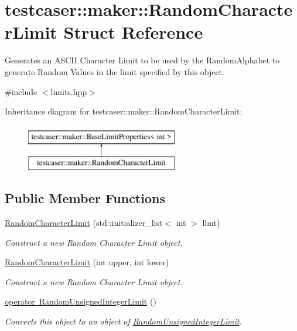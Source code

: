 \hypertarget{structtestcaser_1_1maker_1_1RandomCharacterLimit}{}\section{testcaser\+:\+:maker\+:\+:Random\+Character\+Limit Struct Reference}
\label{structtestcaser_1_1maker_1_1RandomCharacterLimit}


Generates an A\+S\+C\+II Character Limit to be used by the Random\+Alphabet to generate Random Values in the limit specified by this object.  




{\ttfamily \#include $<$limits.\+hpp$>$}

Inheritance diagram for testcaser\+:\+:maker\+:\+:Random\+Character\+Limit\+:\begin{figure}[H]
\begin{center}
\leavevmode
\includegraphics[height=2.000000cm]{structtestcaser_1_1maker_1_1RandomCharacterLimit}
\end{center}
\end{figure}
\subsection*{Public Member Functions}
\begin{DoxyCompactItemize}
\item 
\mbox{\hyperlink{structtestcaser_1_1maker_1_1RandomCharacterLimit_a2ebd894bf7f536219bf7a917ed036c55}{Random\+Character\+Limit}} (std\+::initializer\+\_\+list$<$ int $>$ llmt)
\begin{DoxyCompactList}\small\item\em Construct a new Random Character Limit object. \end{DoxyCompactList}\item 
\mbox{\hyperlink{structtestcaser_1_1maker_1_1RandomCharacterLimit_a7a85c6420ec09f97e648f516a9bb68fd}{Random\+Character\+Limit}} (int upper, int lower)
\begin{DoxyCompactList}\small\item\em Construct a new Random Character Limit object. \end{DoxyCompactList}\item 
\mbox{\hyperlink{structtestcaser_1_1maker_1_1RandomCharacterLimit_a230a33b5d028fdef4a027f7c96663d32}{operator Random\+Unsigned\+Integer\+Limit}} ()
\begin{DoxyCompactList}\small\item\em Converts this object to an object of \mbox{\hyperlink{structtestcaser_1_1maker_1_1RandomUnsignedIntegerLimit}{Random\+Unsigned\+Integer\+Limit}}. \end{DoxyCompactList}\end{DoxyCompactItemize}
